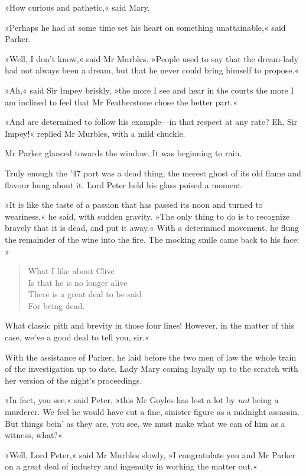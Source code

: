»How curious and pathetic,« said Mary.

»Perhaps he had at some time set his heart on something unattainable,« said Parker.

»Well, I don't know,« said Mr Murbles. »People used to say that the dream-lady had not always been a dream, but that he never could bring himself to propose.«

»Ah,« said Sir Impey briskly, »the more I see and hear in the courts the more I am inclined to feel that Mr Featherstone chose the better part.«

»And are determined to follow his example\allowbreak---\allowbreak in that respect at any rate?  Eh, Sir Impey!« replied Mr Murbles, with a mild chuckle.

Mr Parker glanced towards the window. It was beginning to rain.

Truly enough the '47 port was a dead thing; the merest ghost of its old flame and flavour hung about it. Lord Peter held his glass poised a moment.

»It is like the taste of a passion that has passed its noon and turned to weariness,« he said, with sudden gravity. »The only thing to do is to recognize bravely that it is dead, and put it away.« With a determined movement, he flung the remainder of the wine into the fire.  The mocking smile came back to his face: 
»\begin{verse}
What I like about Clive\\
Is that he is no longer alive\longdash \\
There is a great deal to be said\\
For being dead.\\
\end{verse}

What classic pith and brevity in those four lines! However, in the matter of this case, we've a good deal to tell you, sir.«

With the assistance of Parker, he laid before the two men of law the whole train of the investigation up to date, Lady Mary coming loyally up to the scratch with her version of the night's proceedings.

»In fact, you see,« said Peter, »this Mr Goyles has lost a lot by \textit{not} being a murderer. We feel he would have cut a fine, sinister figure as a midnight assassin. But things bein' as they are, you see, we must make what we can of him as a witness, what?«

»Well, Lord Peter,« said Mr Murbles slowly, »I congratulate you and Mr Parker on a great deal of industry and ingenuity in working the matter out.«

